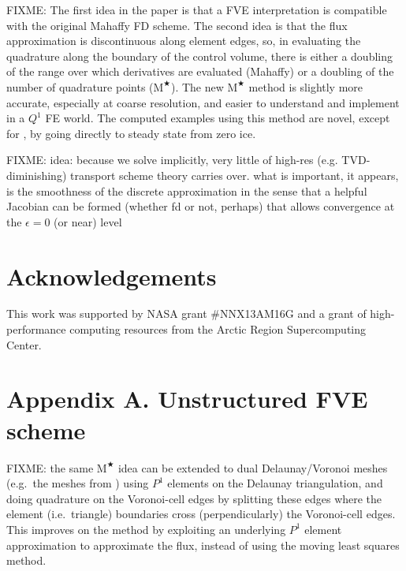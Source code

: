 \documentclass[twocolumn,letterpaper]{igs}
\newcommand\eps{\epsilon}
\newcommand{\Mstar}{$\text{M}^{\bigstar}$\xspace}
\begin{document}
FIXME: The first idea in the paper is that a FVE interpretation is compatible with the original Mahaffy FD scheme.  The second idea is that the flux approximation is discontinuous along element edges, so, in evaluating the quadrature along the boundary of the control volume, there is either a doubling of the range over which derivatives are evaluated (Mahaffy) or a doubling of the number of quadrature points (\Mstar).  The new \Mstar method is slightly more accurate, especially at coarse resolution, and easier to understand and implement in a $Q^1$ FE world.  The computed examples using this method are novel, except for \cite{JouvetBueler2012}, by going directly to steady state from zero ice.

FIXME: idea: because we solve implicitly, very little of high-res (e.g. TVD-diminishing) transport scheme theory carries over.  what is important, it appears, is the smoothness of the discrete approximation in the sense that a helpful Jacobian can be formed (whether fd or not, perhaps) that allows convergence at the $\eps=0$ (or near) level


\section*{Acknowledgements}
This work was supported by NASA grant \#NNX13AM16G and a grant of high-performance computing resources from the Arctic Region Supercomputing Center.





\appendix
\section{Appendix A.  Unstructured FVE scheme}  \label{sec:appA}

FIXME: the same \Mstar idea can be extended to dual Delaunay/Voronoi meshes (e.g.~the meshes from \cite{EgholmNielsen2010,Ringleretal2013}) using $P^1$ elements on the Delaunay triangulation, and doing quadrature on the Voronoi-cell edges by splitting these edges where the element (i.e.~triangle) boundaries cross (perpendicularly) the Voronoi-cell edges.  This improves on the \cite{EgholmNielsen2010} method by exploiting an underlying $P^1$ element approximation to approximate the flux, instead of using the moving least squares method.
\end{document}
